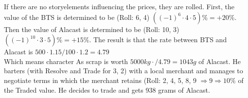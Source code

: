 If there are no storyelements influencing the prices, they are rolled.
First, the value of the BTS is determined to be (Roll: 6, 4) \(((-1)^{6}\cdot4\cdot5) \% = +20\%\).
Then the value of Alacast is determined
to be (Roll: 10, 3)\(((-1)^{10}\cdot3\cdot5) \% = +15\%\).
The result is that the rate between BTS and Alacast is
\( 500\cdot1.15/100\cdot1.2 = 4.79\) \\ Which means character As scrap is worth
\(5000 kg\cdot / 4.79 = 1043 g \) of Alacast.
He barters (with Resolve and Trade for 3, 2) with a local merchant and manages to
negotiate terms in which the merchant retains (Roll: 2, 4, 5, 8, 9 \(\Rightarrow 9 \Rightarrow 10\%\) of the Traded
value.
He decides to trade and gets 938 grams of Alacast.\vspace{1.5cm}
\pagebreak
